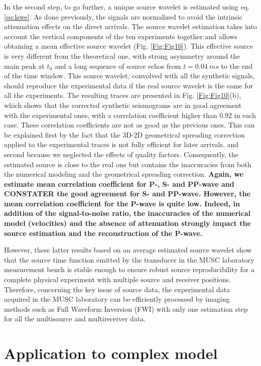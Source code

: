 \documentclass[extra,mreferee]{gji}
\newenvironment{orangenote}{\par\color{Orange}}{\par}
\begin{document}
\begin{orangenote}
In the second step, to go further, a unique source wavelet is estimated using eq. \ref{eq:lswe}. As done previously, the signals are normalized to avoid the intrinsic attenuation effects on the direct arrivals. The source wavelet estimation takes into account the vertical components of the ten experiments together and allows obtaining a mean effective source wavelet (Fig. \ref{Fig:Fig10}). This effective source is very different from the theoretical one, with strong asymmetry around the main peak at $t_{0}$ and a long sequence of source echos from $t=0.04\ ms$ to the end of the time window. This source wavelet, convolved with all the synthetic signals, should reproduce the experimental data if the real source wavelet is the same for all the experiments. The resulting traces are presented in Fig. \ref{Fig:Fig10}(b), which shows that the corrected synthetic seismograms are in good agreement with the experimental ones, with a correlation coefficient higher than $0.92$ in each case. These correlation coefficients are not as good as the previous ones. This can be explained first by the fact that the 3D-2D geometrical spreading correction applied to the experimental traces is not fully efficient for later arrivals, and second because we neglected the effects of quality factors. Consequently, the estimated source is close to the real one but contains the inaccuracies from both the numerical modeling and the geometrical spreading correction. \textbf{Again, we estimate mean correlation coefficient for P-, S- and PP-wave and CONSTATER the good agreement for S- and PP-wave. However, the mean correlation coefficient for the P-wave is quite low. Indeed, in addition of the signal-to-noise ratio, the inaccuracies of the numerical model (velocities) and the absence of attenuation strongly impact the source estimation and the reconstruction of the P-wave.}  

However, these latter results based on an average estimated source wavelet show that the source time function emitted by the transducer in the MUSC laboratory measurement bench is stable enough to ensure robust source reproducibility for a complete physical experiment with multiple source and receiver positions. Therefore, concerning the key issue of source data, the experimental data acquired in the MUSC laboratory can be efficiently processed by imaging methods such as Full Waveform Inversion (FWI) with only one estimation step for all the multisource and multireceiver data.

\section{Application to complex model}


\end{orangenote}
\end{document}

